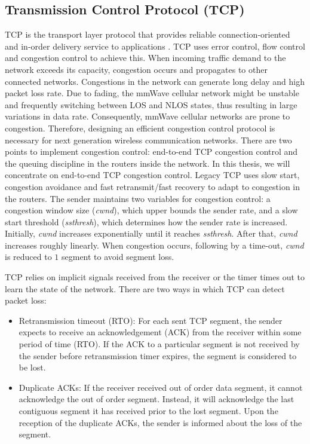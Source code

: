\subsection{Transmission Control Protocol (TCP)}
\label{subsec:3}
\par TCP is the transport layer protocol that provides reliable connection-oriented and in-order delivery service to applications \cite{panwar2004tcp}. TCP uses error control, flow control and congestion control to achieve this. When incoming traffic demand to the network exceeds its capacity, congestion occurs and propagates to other connected networks. Congestions in the network can generate long delay and high packet loss rate. Due to fading, the mmWave cellular network might be unstable and frequently switching between LOS and NLOS states, thus resulting in large variations in data rate. Consequently, mmWave cellular networks are prone to congestion. Therefore, designing an efficient congestion control protocol is necessary for next generation wireless communication networks. There are two points to implement congestion control: end-to-end TCP congestion control and the queuing discipline in the routers inside the network. In this thesis, we will concentrate on end-to-end TCP congestion control. Legacy TCP uses slow start, congestion avoidance and fast retransmit/fast recovery to adapt to congestion in the routers. The sender maintains two variables for congestion control: a congestion window size (\emph{cwnd}), which upper bounds the sender rate, and a slow start threshold (\emph{ssthresh}), which determines how the sender rate is increased. Initially, \emph{cwnd} increases exponentially until it reaches \emph{ssthresh}. After that, \emph{cwnd} increases roughly linearly. When congestion occurs, following by a time-out, \emph{cwnd} is reduced to $1$ segment to avoid segment loss. 
\par TCP relies on implicit signals received from the receiver or the timer times out to learn the state of the network. There are two ways in which TCP can detect packet loss: 
\begin{itemize}
\item Retransmission timeout (RTO): For each sent TCP segment, the sender expects to receive an acknowledgement (ACK) from the receiver within some period of time (RTO). If the ACK to a particular segment is not received by the sender before retransmission timer expires, the segment is considered to be lost. 
\item Duplicate ACKs: If the receiver received out of order data segment, it cannot acknowledge the out of order segment. Instead, it will acknowledge the last contiguous segment it has received prior to the lost segment. Upon the reception of the duplicate ACKs, the sender is informed about the loss of the segment.
\end{itemize}
